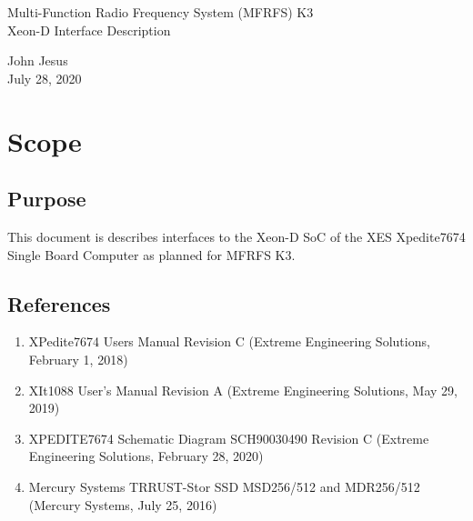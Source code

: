 \documentclass[12pt]{article}
\begin{document}
\thispagestyle{empty}
\begin{titlepage}
\begin{center}
        \vspace*{1cm}

        \LARGE{Multi-Function Radio Frequency System (MFRFS) K3 \\
            Xeon-D Interface Description}

        \vspace{0.5cm}
        \LARGE

        \vspace{1.5cm}

        \normalsize

        John Jesus \\
        July 28, 2020

        \vfill



        \vspace{0.8cm}




\end{center}
\end{titlepage}

\tableofcontents
\newpage

\section{Scope}
\subsection{Purpose}
This document is describes interfaces to the Xeon-D SoC of
the XES Xpedite7674 Single Board Computer as planned for MFRFS K3.

\subsection{References}
\begin{enumerate}
    \item XPedite7674 Users Manual Revision C (Extreme Engineering Solutions, February 1, 2018) \label{ref:board_man}
    \item XIt1088 User’s Manual Revision A (Extreme Engineering Solutions, May 29, 2019) \label{ref:rtm_man}
    \item XPEDITE7674 Schematic Diagram SCH90030490 Revision C (Extreme Engineering Solutions, February 28, 2020) \label{ref:schematic}
    \item Mercury Systems TRRUST-Stor SSD MSD256/512 and MDR256/512 (Mercury Systems, July 25, 2016) \label{ref:mercurty_ssd}
\end{enumerate}
\end{document}
